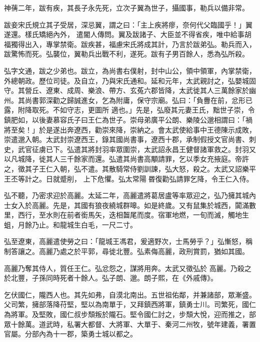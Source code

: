 \begin{pinyinscope}
 神蒨二年，跋有疾，其長子永先死，立次子翼為世子，攝國事，勒兵以備非常。



 跋妾宋氏規立其子受居，深忌翼，謂之曰：「主上疾將瘳，奈何代父臨國乎！」翼遂還。樣氏矯絕內外，
 遣閽人傳問。翼及跋諸子、大臣並不得省疾，唯中給事胡福獨得出入，專掌禁衛。跋疾甚，福慮宋氏將成其計，乃言於跋弟弘。勒兵而入，跋驚怖而死。弘襲位，翼勒兵出戰不利，遂死。跋有子男百餘人，悉為弘所殺。



 弘字文通，跋之少弟也。跋立，為尚書右僕射，封中山公，領中領軍，內掌禁衛，外總朝政。歷位司徒。及自立，乃與宋氏通和。延和元年，太武親討之，弘嬰城固守。其營丘、遼東、成周、樂浪、帶方、玄菟六郡皆降，太武徙其人三萬餘家於幽州。其尚書郭深勸之歸誠進女，乞為附庸，保守宗廟。弘曰：「負釁在前，忿形已露，附降取死。不如守志，更圖所
 適也。」先是，弘廢其元妻王氏，黜世子崇，令鎮肥如，以後妻慕容氏子曰王仁為世子。崇母弟廣平公朗、樂陵公邈相謂曰：「禍將至矣！」於是遂出奔遼西，勸崇來降，崇納之。會太武使給事中王德陳示成敗，崇遣邈入朝。太武封崇遼西王，錄其國尚書事，遼西十郡，承制假授文官尚書、刺史，武官征虜已下。弘遣其將封羽率眾圍崇，太武詔永昌王健督諸軍救之。封羽又以凡城降，徙其人三千餘家而還。弘遣其尚書高顒請罪，乞以季女充掖庭。帝許之，徵其子王仁入朝，弘不遣。其散騎常侍劉訓諫，弘大怒，殺之。太武又詔樂平王丕等計之。日就蹙削，
 上下危懼。弘太常陽昬復勸弘請罪乞降，令王仁入侍。



 弘不聽，乃密求迎於高麗。太延二年，高麗遣將葛居盧等率眾迎之，弘乃擁其城內士女入於高麗。先是，其國有狼夜繞城群嗥。如是終歲。又有鼠集於城西，闐滿數里，西行，至水則在前者銜馬矢，迭相齧尾而度。宿軍地燃，一旬而滅，觸地生蛆，月餘乃止。和龍城生白毛，一尺二寸。



 弘至遼東，高麗遣使勞之曰：「龍城王馮君，爰適野次，士馬勞乎？」弘慚怒，稱制答讓之。高麗乃處之於平郭，尋徙北豐。弘素侮高麗，政刑賞罰，猶如其國。



 高麗乃奪其侍人，質任王仁。弘忿怨之，謀將用奔。太武又徵弘於
 高麗。乃殺之於北豐，子孫同時死者十餘人。弘子朗、邈。朗子熙，在《外戚傳》。



 乞伏國仁，隴西人也。其先如弗，自漠北南出。五世祖佑鄰，并兼諸部，眾漸盛。父司繁，擁部落降苻堅，堅以為南單于，又拜鎮西將軍，鎮勇士川。司繁死，國仁為將軍。及堅敗，國仁叔步頹叛於隴石。堅令國仁討之，步頹大悅，迎而推之，部眾十餘萬。道武時，私署大都督、大將軍、大單于、秦河二州牧，號年建義，署置官屬。分部內為十一郡，築勇士城以都之。




\end{pinyinscope}

